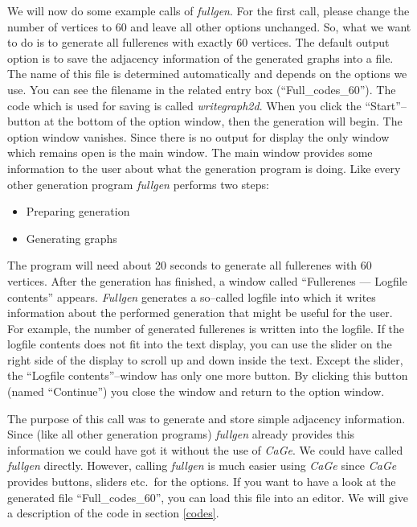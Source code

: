 \documentclass[a4paper]{article}
\def\CaGe{\textit{CaGe}}
\begin{document}
We will now do some example calls of \textit{fullgen}. For the first call,
please change the number of vertices to 60 and leave all other options
unchanged. So, what we want to do is to generate all fullerenes with exactly
60 vertices. The default output option is to save the adjacency information
of the generated graphs into a file. The name of this file is determined
automatically and depends on the options we use. You can see the filename
in the related entry box (``Full\_codes\_60''). 
The code which is used for saving is called
\textit{writegraph2d}. When you click the ``Start''--button at the bottom
of the option window, then the generation will begin. The option window
vanishes. Since there is no output for display the only window which remains
open is the main window. The main window provides some information to the user
about what the generation program is doing. Like every other generation program
\textit{fullgen} performs two steps:
\begin{itemize}
\item Preparing generation
\item Generating graphs
\end{itemize}
The program will need about 20 seconds to generate all fullerenes with 60
vertices. After the generation has finished, a window called 
``Fullerenes --- Logfile
contents'' appears. \textit{Fullgen} generates a so--called logfile into which
it writes information about the performed generation that might be useful for
the user. For example, the number of generated fullerenes is written into the
logfile. If the logfile contents does not fit into the text display, you can
use the slider on the right side of the display to scroll up and down inside
the text. Except the slider, 
the ``Logfile contents''--window has only one more button. By clicking
this button (named ``Continue'') you close the window and return to the 
option window. 

The purpose of this call was to generate and store simple adjacency 
information. Since (like all other generation programs) \textit{fullgen} 
already provides this information
we could have got it without the use of \CaGe{}. We could have called
\textit{fullgen} directly. However, calling \textit{fullgen} is much easier
using \CaGe{} since \CaGe{} provides buttons, sliders etc.~for the options.
If you want to have a look at the generated file ``Full\_codes\_60'', you can 
load this file into an editor. We will give a description of the code in
section \ref{codes}. 
\end{document}
